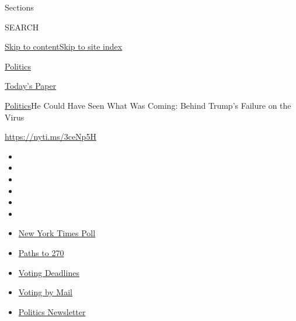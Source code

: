Sections

SEARCH

\protect\hyperlink{site-content}{Skip to
content}\protect\hyperlink{site-index}{Skip to site index}

\href{https://www.nytimes3xbfgragh.onion/section/politics}{Politics}

\href{https://myaccount.nytimes3xbfgragh.onion/auth/login?response_type=cookie\&client_id=vi}{}

\href{https://www.nytimes3xbfgragh.onion/section/todayspaper}{Today's
Paper}

\href{/section/politics}{Politics}\textbar{}He Could Have Seen What Was
Coming: Behind Trump's Failure on the Virus

\url{https://nyti.ms/3ceNp5H}

\begin{itemize}
\item
\item
\item
\item
\item
\item
\end{itemize}

\begin{itemize}
\item
  \href{https://www.nytimes3xbfgragh.onion/2020/09/12/us/politics/biden-trump-poll-wisconsin-minnesota.html?action=click\&pgtype=Article\&state=default\&region=TOP_BANNER\&context=storylines_menu}{New
  York Times Poll}
\item
  \href{https://www.nytimes3xbfgragh.onion/interactive/2020/us/elections/election-states-biden-trump.html?action=click\&pgtype=Article\&state=default\&region=TOP_BANNER\&context=storylines_menu}{Paths
  to 270}
\item
  \href{https://www.nytimes3xbfgragh.onion/interactive/2019/us/elections/2020-presidential-election-calendar.html?action=click\&pgtype=Article\&state=default\&region=TOP_BANNER\&context=storylines_menu}{Voting
  Deadlines}
\item
  \href{https://www.nytimes3xbfgragh.onion/interactive/2020/08/31/us/politics/vote-by-mail-deadlines.html?action=click\&pgtype=Article\&state=default\&region=TOP_BANNER\&context=storylines_menu}{Voting
  by Mail}
\item
  \href{https://www.nytimes3xbfgragh.onion/newsletters/politics?action=click\&pgtype=Article\&state=default\&region=TOP_BANNER\&context=storylines_menu}{Politics
  Newsletter}
\end{itemize}


